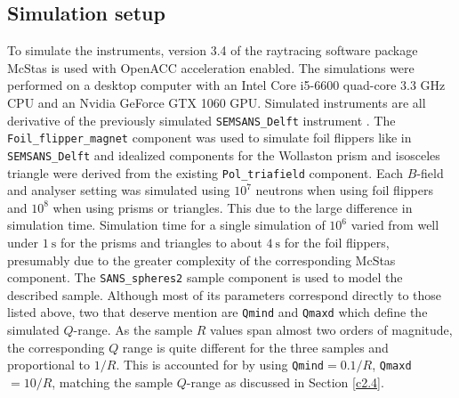 \subsection{Simulation setup}
To simulate the instruments, version 3.4 of the raytracing software package McStas \cite{willendrup2020} is used with OpenACC acceleration enabled. The simulations were performed on a desktop computer with an Intel Core i5-6600 quad-core 3.3 GHz CPU and an Nvidia GeForce GTX 1060 GPU. Simulated instruments are all derivative of the previously simulated \texttt{SEMSANS\_Delft} instrument \cite{bouwman2021b}. The \texttt{Foil\_flipper\_magnet} component was used to simulate foil flippers like in \texttt{SEMSANS\_Delft} and idealized components for the Wollaston prism and isosceles triangle were derived from the existing \texttt{Pol\_triafield} component. Each $B$-field and analyser setting was simulated using $10^7$ neutrons when using foil flippers and $10^8$ when using prisms or triangles. This due to the large difference in simulation time. Simulation time for a single simulation of $10^6$ varied from well under $\SI{1}{\second}$ for the prisms and triangles to about $\SI{4}{\second}$ for the foil flippers, presumably due to the greater complexity of the corresponding McStas component. 
The \texttt{SANS\_spheres2} sample component is used to model the described sample. Although most of its parameters correspond directly to those listed above, two that deserve mention are \texttt{Qmind} and \texttt{Qmaxd} which define the simulated $Q$-range. As the sample $R$ values span almost two orders of magnitude, the corresponding $Q$ range is quite different for the three samples and proportional to $1/R$. This is accounted for by using \texttt{Qmind}$=0.1/R$, \texttt{Qmaxd}$=10/R$, matching the sample $Q$-range as discussed in Section \ref{c2.4}.

